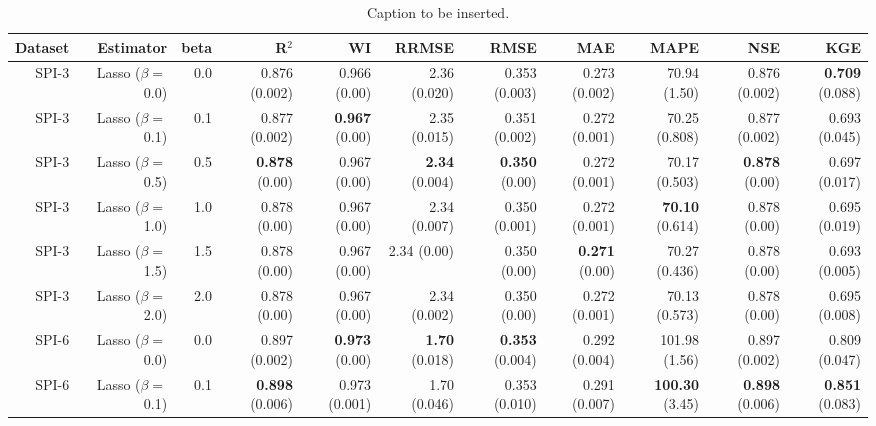 \begin{table}
\centering
\caption{Caption to be inserted.}
\label{sp__comparison_datasets_table}
\begin{tabular}{rrrrrrrrrrr}
\toprule
Dataset &             Estimator &  beta &                R$^2$ &                  WI &               RRMSE &                 RMSE &                  MAE &                  MAPE &                  NSE &                  KGE \\
\midrule
  SPI-3 & Lasso ($\beta = $0.0) &   0.0 &        0.876 (0.002) &        0.966 (0.00) &        2.36 (0.020) &        0.353 (0.003) &        0.273 (0.002) &          70.94 (1.50) &        0.876 (0.002) & { \bf 0.709} (0.088) \\
  SPI-3 & Lasso ($\beta = $0.1) &   0.1 &        0.877 (0.002) & { \bf 0.967} (0.00) &        2.35 (0.015) &        0.351 (0.002) &        0.272 (0.001) &         70.25 (0.808) &        0.877 (0.002) &        0.693 (0.045) \\
  SPI-3 & Lasso ($\beta = $0.5) &   0.5 &  { \bf 0.878} (0.00) &        0.967 (0.00) & { \bf 2.34} (0.004) &  { \bf 0.350} (0.00) &        0.272 (0.001) &         70.17 (0.503) &  { \bf 0.878} (0.00) &        0.697 (0.017) \\
  SPI-3 & Lasso ($\beta = $1.0) &   1.0 &         0.878 (0.00) &        0.967 (0.00) &        2.34 (0.007) &        0.350 (0.001) &        0.272 (0.001) &  { \bf 70.10} (0.614) &         0.878 (0.00) &        0.695 (0.019) \\
  SPI-3 & Lasso ($\beta = $1.5) &   1.5 &         0.878 (0.00) &        0.967 (0.00) &         2.34 (0.00) &         0.350 (0.00) &  { \bf 0.271} (0.00) &         70.27 (0.436) &         0.878 (0.00) &        0.693 (0.005) \\
  SPI-3 & Lasso ($\beta = $2.0) &   2.0 &         0.878 (0.00) &        0.967 (0.00) &        2.34 (0.002) &         0.350 (0.00) &        0.272 (0.001) &         70.13 (0.573) &         0.878 (0.00) &        0.695 (0.008) \\
  SPI-6 & Lasso ($\beta = $0.0) &   0.0 &        0.897 (0.002) & { \bf 0.973} (0.00) & { \bf 1.70} (0.018) & { \bf 0.353} (0.004) &        0.292 (0.004) &         101.98 (1.56) &        0.897 (0.002) &        0.809 (0.047) \\
  SPI-6 & Lasso ($\beta = $0.1) &   0.1 & { \bf 0.898} (0.006) &       0.973 (0.001) &        1.70 (0.046) &        0.353 (0.010) &        0.291 (0.007) &  { \bf 100.30} (3.45) & { \bf 0.898} (0.006) & { \bf 0.851} (0.083) \\

\end{tabular}
\end{table}
